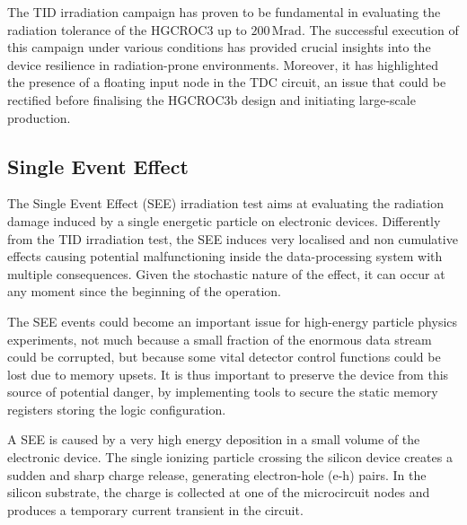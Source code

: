 \bigbreak

The TID irradiation campaign has proven to be fundamental in evaluating the radiation tolerance of the HGCROC3 up to $200\,\textrm{Mrad}$. The successful execution of this campaign under various conditions has provided crucial insights into the device resilience in radiation-prone environments. 
Moreover, it has highlighted the presence of a floating input node in the TDC circuit, an issue that could be rectified before finalising the HGCROC3b design and initiating large-scale production. 


\subsection{Single Event Effect}
\label{subsec:Single Event Effect}

The Single Event Effect (SEE) irradiation test aims at evaluating the radiation damage induced by a single energetic particle on electronic devices. Differently from the TID irradiation test, the SEE induces very localised and non cumulative effects causing potential malfunctioning inside the data-processing system with multiple consequences. Given the stochastic nature of the effect, it can occur at any moment since the beginning of the operation.

The SEE events could become an important issue for high-energy particle physics experiments, not much because a small fraction of the enormous data stream could be corrupted, but because some vital detector control functions could be lost due to memory upsets. It is thus important to preserve the device from this source of potential danger, by implementing tools to secure the static memory registers storing the logic configuration.

\bigbreak

A SEE is caused by a very high energy deposition in a small volume of the electronic device. The single ionizing particle crossing the silicon device creates a sudden and sharp charge release, generating electron-hole (e-h) pairs. In the silicon substrate, the charge is collected at one of the microcircuit nodes and produces a temporary current transient in the circuit. 

